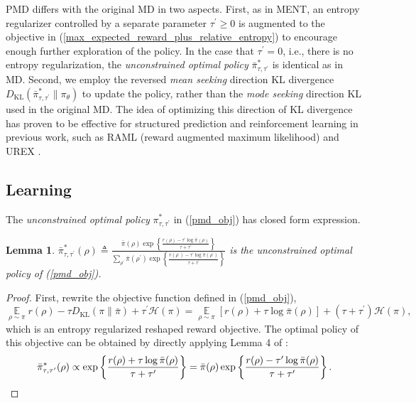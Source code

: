 \documentclass{article}
\DeclareMathOperator*\ep{\mathbb{E}}
\newcommand*{\refPi}{\bar{\pi}}
\newcommand*{\cH}{\mathcal{H}}
\newcommand{\KL}{D_{\text{KL}}}
\newtheorem{lem}{Lemma}
\begin{document}
PMD differs with the original MD in two aspects. First, as in MENT, an entropy regularizer controlled by a separate parameter $\tau^{\prime}\geq 0$ is augmented to the objective in (\ref{max_expected_reward_plus_relative_entropy}) to encourage enough further exploration of the policy. In the case that $\tau^{\prime}=0$, i.e., there is no entropy regularization, the \emph{unconstrained optimal policy} $\bar{\pi}_{\tau,\tau^{\prime}}^*$ is identical as in MD. Second, we employ the reversed \emph{mean seeking} direction KL divergence $\KL(\bar{\pi}_{\tau,\tau^{\prime}}^* \| \pi_\theta)$ to update the policy, rather than the \emph{mode seeking} direction KL used in the original MD. The idea of optimizing this direction of KL divergence has proven to be effective for structured prediction and reinforcement learning in previous work, such as RAML (reward augmented maximum likelihood) \cite{norouzi2016reward} and UREX \cite{nachum2017improving}.

\subsection{Learning}
The \emph{unconstrained optimal policy} $\pi_{\tau,\tau^{\prime}}^*$ in (\ref{pmd_obj}) has closed form expression.
\begin{lem}
$\bar{\pi}_{\tau,\tau^{\prime}}^*(\rho) \triangleq \frac{\refPi(\rho) \exp\left\{ \frac{r(\rho)-\tau^{\prime} \log \refPi(\rho) }{ \tau+\tau^{\prime}} \right\}}{ \sum_{\rho^{\prime}}{\refPi(\rho^{\prime}) \exp\left\{ \frac{r(\rho^{\prime})-\tau^{\prime} \log \refPi(\rho^{\prime})}{ \tau+\tau^{\prime}} \right\} } }$ is the unconstrained optimal policy of (\ref{pmd_obj}).
\label{opt_pi_ref}
\end{lem}
\begin{proof}
First, rewrite the objective function defined in (\ref{pmd_obj}),
\begin{equation}
\ep\limits_{\rho \sim \pi} r(\rho)  - \tau \KL(\pi \| \refPi) + \tau^{\prime} \cH(\pi) = \ep\limits_{\rho \sim \pi} [r(\rho) + \tau \log \refPi(\rho)] + (\tau+\tau^{\prime}) \cH(\pi),
\end{equation}
which is an entropy regularized reshaped reward objective. The optimal policy of this objective can be obtained by directly applying Lemma 4 of \cite{nachum2017bridging}:
\begin{equation}
\bar{\pi}_{\tau,\tau^{\prime}}^*(\rho)\propto \exp\left\{ \frac{r(\rho)+\tau \log \refPi(\rho)}{\tau+\tau^{\prime}} \right\} = \refPi(\rho) \exp\left\{ \frac{r(\rho)-\tau^{\prime} \log \refPi(\rho)}{\tau+\tau^{\prime}} \right\}. \qedhere
\end{equation}
\end{proof}
\end{document}
